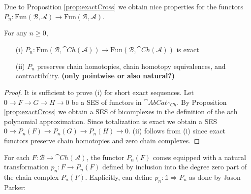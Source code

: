 Due to Proposition \ref{prop:exactCross} we obtain nice properties for the functors $P_n:\text{Fun}(\mathcal{B},\mathcal{A})\rightarrow \text{Fun}(\mathcal{B},\mathcal{A})$.

\begin{prop}[label=prop:exactPol]
    For any $n \geq 0$,
    \begin{itemize}
        \item[(i)] $P_n:\text{Fun}(\mathcal{B},\cat{Ch}(\mathcal{A}))\rightarrow \text{Fun}(\mathcal{B},\cat{Ch}(\mathcal{A}))$ is exact
        \item[(ii)] $P_n$ preserves chain homotopies, chain homotopy equivalences, and contractibility. \textbf{(only pointwise or also natural?)}
    \end{itemize}
\end{prop}
\begin{proof}
    It is sufficient to prove (i) for short exact sequences. Let $0 \rightarrow F\rightarrow G\rightarrow H\rightarrow 0$ be a SES of functors in $\cat{AbCat}_{\cat{Ch}}$. By Proposition \ref{prop:exactCross} we obtain a SES of bicomplexes in the definition of the $n$th polynomial approximation. Since totalization is exact we obtain a SES $0 \rightarrow P_n(F)\rightarrow P_n(G)\rightarrow P_n(H)\rightarrow 0$. (ii) follows from (i) since exact functors preserve chain homotopies and zero chain complexes.
\end{proof}

For each $F:\mathcal{B}\rightarrow \cat{Ch}(\mathcal{A})$, the functor $P_n(F)$ comes equipped with a natural transformation $p_n:F\rightarrow P_n(F)$ defined by inclusion into the degree zero part of the chain complex $P_n(F)$. Explicitly, can define $p_n:\mathbb{1}\Rightarrow P_n$ as done by Jason Parker:

